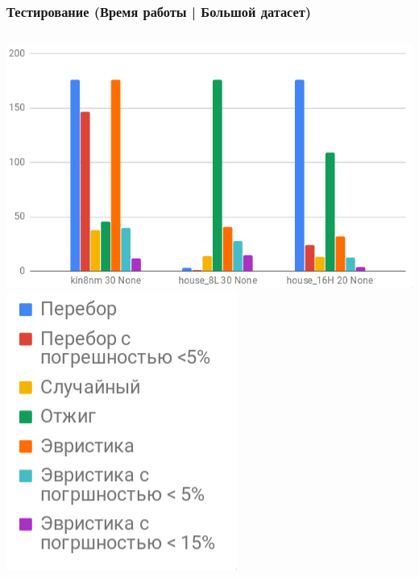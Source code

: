 \documentclass{beamer}
\begin{document}
\begin{frame} \frametitle{Тестирование (Время работы | Большой датасет)}
    \vfill
    \begin{columns}
        \includegraphics[width=\textwidth]{time_big.png}
        \includegraphics[width=\textwidth]{time_legend.png}
    \end{columns}
\end{frame}
\end{document}
